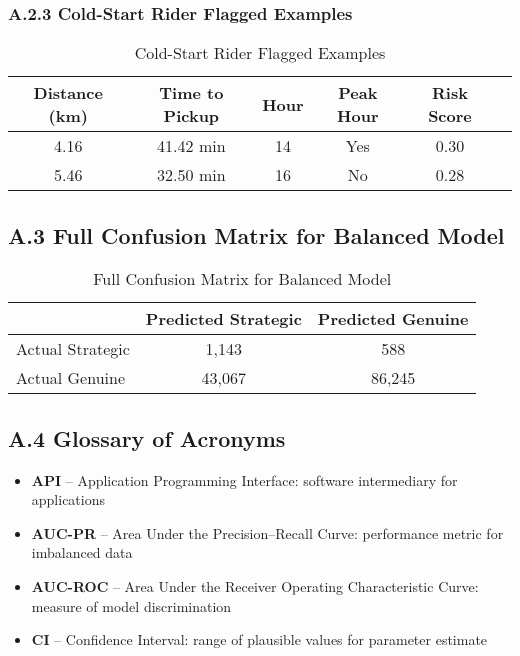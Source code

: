 \documentclass[12pt,letterpaper]{article}
\begin{document}
\subsubsection*{A.2.3 Cold-Start Rider Flagged Examples}

\begin{table}[H]
\centering
\caption{Cold-Start Rider Flagged Examples}
\label{tab:cold_start_examples}
\begin{tabular}{cccccc}
\toprule
\textbf{Distance (km)} & \textbf{Time to Pickup} & \textbf{Hour} & \textbf{Peak Hour} & \textbf{Risk Score} \\
\midrule
4.16 & 41.42 min & 14 & Yes & 0.30 \\
5.46 & 32.50 min & 16 & No  & 0.28 \\
\bottomrule
\end{tabular}
\end{table}

\vspace{1em}

\subsection*{A.3 Full Confusion Matrix for Balanced Model}

\begin{table}[H]
\centering
\caption{Full Confusion Matrix for Balanced Model}
\label{tab:balanced_confusion}
\begin{tabular}{lcc}
\toprule
\textbf{} & \textbf{Predicted Strategic} & \textbf{Predicted Genuine} \\
\midrule
Actual Strategic & 1,143 & 588 \\
Actual Genuine   & 43,067 & 86,245 \\
\bottomrule
\end{tabular}
\end{table}

\vspace{1em}

\subsection*{A.4 Glossary of Acronyms}

\begin{itemize}
    \item \textbf{API} -- Application Programming Interface: software intermediary for applications
    \item \textbf{AUC-PR} -- Area Under the Precision--Recall Curve: performance metric for imbalanced data
    \item \textbf{AUC-ROC} -- Area Under the Receiver Operating Characteristic Curve: measure of model discrimination
    \item \textbf{CI} -- Confidence Interval: range of plausible values for parameter estimate
\end{itemize}
\end{document}
